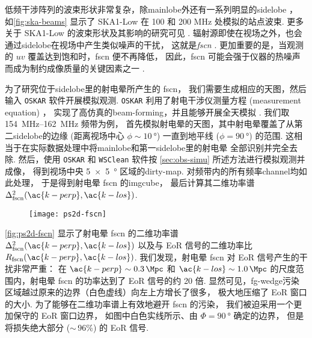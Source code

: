 低频干涉阵列的波束形状非常复杂，除\ac{mainlobe}外还有一系列明显的\ac{sidelobe}
\cite{noordam2004,wijnholds2010}，
如\autoref{fig:ska-beams} 显示了 SKA1-Low 在 100 和 200 MHz 处模拟的站点波束.
更多关于 SKA1-Low 的波束形状及其影响的研究可见 .
辐射源即使在视场之外，也会通过\ac{sidelobe}在视场中产生类似噪声的干扰，
这就是\emph{\acf{fscn}} \cite{smirnov2012}.
更加重要的是，当观测的 $uv$ 覆盖达到饱和时，\ac{fscn} 便不再降低，
因此，\ac{fscn} 可能会强于仪器的热噪声而成为制约成像质量的关键因素之一 \cite{mort2017}.

为了研究位于\ac{sidelobe}里的射电晕所产生的 \ac{fscn}，
我们需要生成相应的天图，然后输入 \texttt{OSKAR} 软件开展模拟观测.
\texttt{OSKAR} 利用了射电干涉仪测量方程 (measurement equation) \cite{smirnov2011}，
实现了高仿真的\ac{beam-forming}，并且能够开展全天模拟 \cite{mort2010}.
我们取 \SIrange{154}{162}{\MHz} 频带为例，
首先模拟射电晕的天图，其中射电晕覆盖了从第二\ac{sidelobe}的边缘
(距离视场中心 $\phi \sim \SI{10}{\degree}$)
一直到地平线 ($\phi = \SI{90}{\degree}$) 的范围.
这相当于在实际数据处理中将\ac{mainlobe}和第一\ac{sidelobe}里的射电晕
全部识别并完全去除.
然后，使用 \texttt{OSKAR} 和 \texttt{WSClean} 软件按
\autoref{sec:obs-simu} 所述方法进行模拟观测并成像，
得到视场中央 \SI{5 x 5}{\degree} 区域的\ac{dirty-map}.
对频带内的所有频率\ac{channel}均如此处理，
于是得到射电晕 \ac{fscn} 的\ac{imgcube}，
最后计算其二维功率谱 $\Delta^2_{\R{fscn}}(\ac{k-perp}, \ac{k-los})$.

\begin{figure}[htp]
  \centering
  \texttt{[image: ps2d-fscn]}
  \label{fig:ps2d-fscn}
\end{figure}

\autoref{fig:ps2d-fscn} 显示了射电晕 \ac{fscn}
的二维功率谱 $\Delta^2_{\R{fscn}}(\ac{k-perp}, \ac{k-los})$
以及与 EoR 信号的二维功率比 $R_{\R{fscn}}(\ac{k-perp}, \ac{k-los})$.
我们发现，射电晕 \ac{fscn} 对 EoR 信号产生的干扰非常严重：
在 $\ac{k-perp} \sim \SI{0.3}{\per\Mpc}$ 
和 $\ac{k-los} \sim \SI{1.0}{\per\Mpc}$
的尺度范围内，射电晕 \ac{fscn} 的功率达到了 EoR 信号的约 20 倍.
显然可见，\ac{fg-wedge}污染区域越过原来的边界（白色虚线）向左上方增长了很多，
极大地压缩了 EoR 窗口的大小.
为了能够在二维功率谱上有效地避开 \ac{fscn} 的污染，
我们被迫采用一个更加保守的 EoR 窗口边界，
如图中白色实线所示、由 $\Phi = \SI{90}{\degree}$ 确定的边界，
但是将损失绝大部分 ($\sim$\,96\%) 的 EoR 信号.

